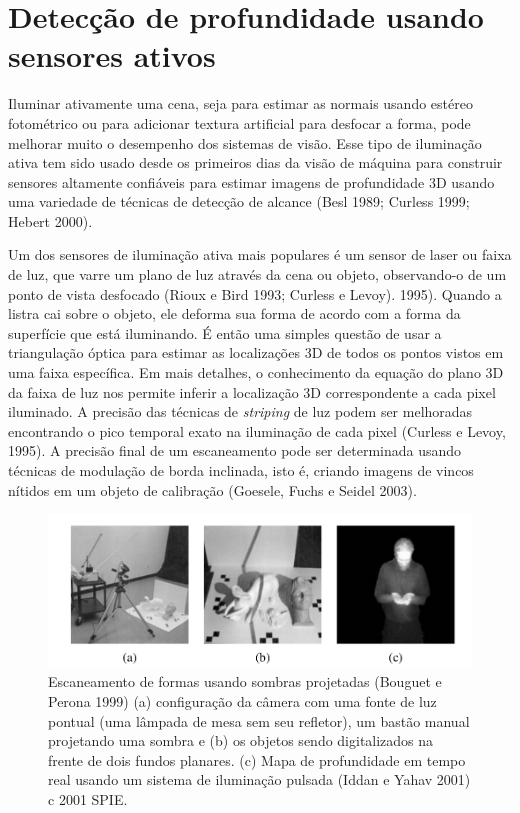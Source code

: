 \documentclass{article}
\begin{document}
\section{Detecção de profundidade usando sensores ativos}

Iluminar ativamente uma cena, seja para estimar as normais usando estéreo fotométrico ou para adicionar textura artificial para desfocar a forma, pode melhorar muito o desempenho dos sistemas de visão. Esse tipo de iluminação ativa tem sido usado desde os primeiros dias da visão de máquina para construir sensores altamente confiáveis para estimar imagens de profundidade 3D usando uma variedade de técnicas de detecção de alcance (Besl 1989; Curless 1999; Hebert 2000).

Um dos sensores de iluminação ativa mais populares é um sensor de laser ou faixa de luz, que varre um plano de luz através da cena ou objeto, observando-o de um ponto de vista desfocado (Rioux e Bird 1993; Curless e Levoy). 1995). Quando a listra cai sobre o objeto, ele deforma sua forma de acordo com a forma da superfície que está iluminando. É então uma simples questão de usar a triangulação óptica para estimar as localizações 3D de todos os pontos vistos em uma faixa específica. Em mais detalhes, o conhecimento da equação do plano 3D da faixa de luz nos permite inferir a localização 3D correspondente a cada pixel iluminado. A precisão das técnicas de \textit{striping} de luz podem ser melhoradas encontrando o pico temporal exato na iluminação de cada pixel (Curless e Levoy, 1995). A precisão final de um escaneamento pode ser determinada usando técnicas de modulação de borda inclinada, isto é, criando imagens de vincos nítidos em um objeto de calibração (Goesele, Fuchs e Seidel 2003).

\begin{figure}[!htb]
    \centering
    \includegraphics[width=1.0\textwidth]{escaneamentoDeFormas.png}
    \caption{Escaneamento de formas usando sombras projetadas (Bouguet e Perona 1999) (a) configuração da câmera com uma fonte de luz pontual (uma lâmpada de mesa sem seu refletor), um bastão manual projetando uma sombra e (b) os objetos sendo digitalizados na frente de dois fundos planares. (c) Mapa de profundidade em tempo real usando um sistema de iluminação pulsada (Iddan e Yahav 2001) c 2001 SPIE.}
    \label{fig:escaneamentoDeFormas}
\end{figure}
\end{document}
